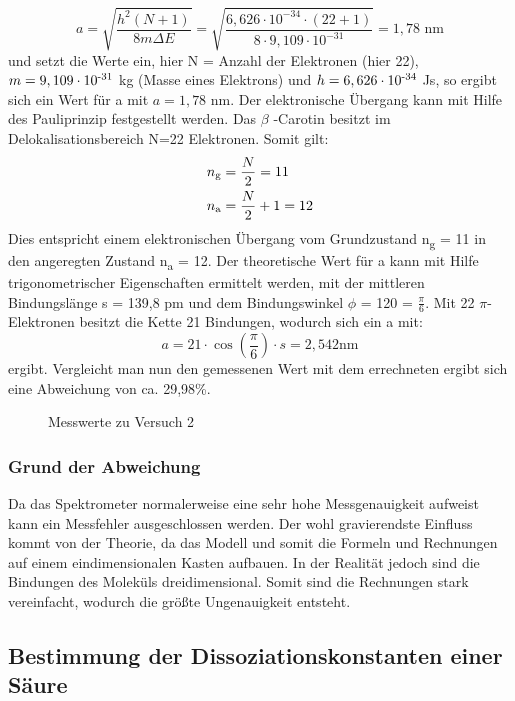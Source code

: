 \documentclass{scrartcl}
\begin{document}
\begin{equation}
	a = \sqrt{\frac{h^2 (N+1)}{8m \Delta E}} = \sqrt{\frac{6,626\cdot10^{-34}\cdot(22+1)}{8\cdot9,109\cdot10^{-31}}} = 1,78 \text{ nm}
\end{equation}
und setzt die Werte ein, hier N = Anzahl der Elektronen (hier 22), $m = 9,109\cdot 10\textsuperscript{-31}$ kg (Masse eines Elektrons) und $h = 6,626\cdot 10\textsuperscript{-34}$ Js, so ergibt sich ein Wert für a mit $a= 1,78 \text{ nm}$.
Der elektronische Übergang kann mit Hilfe des Pauliprinzip festgestellt werden. Das $\beta$ -Carotin besitzt im Delokalisationsbereich N=22 Elektronen. Somit gilt:
\begin{align*}
n\textsubscript{g} &= \frac{N}{2} = 11 \\
n\textsubscript{a} &= \frac{N}{2} +1 = 12 \\
\end{align*}
Dies entspricht einem elektronischen Übergang vom Grundzustand n\textsubscript{g} = 11 in den angeregten Zustand n\textsubscript{a} = 12. Der theoretische Wert für a kann mit Hilfe trigonometrischer Eigenschaften ermittelt werden, mit der mittleren Bindungslänge s = 139,8 pm und dem Bindungswinkel $\phi$ = 120 = $\frac{\pi}{6}$. Mit 22 $\pi$-Elektronen besitzt die Kette 21 Bindungen, wodurch sich ein a mit:
\begin{equation*}
	a = 21 \cdot \cos(\frac{\pi}{6}) \cdot s = 2,542 \text{nm}
\end{equation*}
ergibt. Vergleicht man nun den gemessenen Wert mit dem errechneten ergibt sich eine Abweichung von ca. 29,98\%.
	\begin{figure}[H]
	\centering
	\caption{Messwerte zu Versuch 2}
	
\end{figure}

\subsubsection*{Grund der Abweichung}
Da das Spektrometer normalerweise eine sehr hohe Messgenauigkeit aufweist kann ein Messfehler ausgeschlossen werden. Der wohl gravierendste Einfluss kommt von der Theorie, da das Modell und somit die Formeln und Rechnungen auf einem eindimensionalen Kasten aufbauen. In der Realität jedoch sind die Bindungen des Moleküls dreidimensional. Somit sind die Rechnungen stark vereinfacht, wodurch die größte Ungenauigkeit entsteht.
\subsection{Bestimmung der Dissoziationskonstanten einer Säure}
\end{document}
